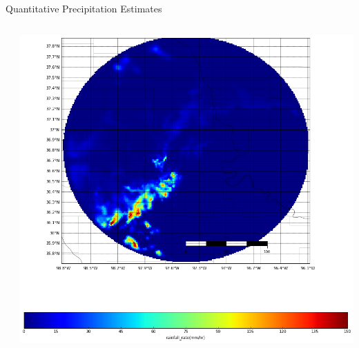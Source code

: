\documentclass[final]{beamer}
\begin{document}
\begin{frame}{}
\begin{columns}[t]
\begin{column}{.3\linewidth}
     \begin{block}{Quantitative Precipitation Estimates}
 	\begin{columns}[t]
		\begin{column}{.4\linewidth}
		\end{column}
                \begin{column}{.6\linewidth}
           		\includegraphics[width=1.0\linewidth]{figures/qpe.png}\\[1ex]     
 		\end{column}
	\end{columns}
      \end{block}



\end{column}
\end{columns}
\end{frame}
\end{document}
